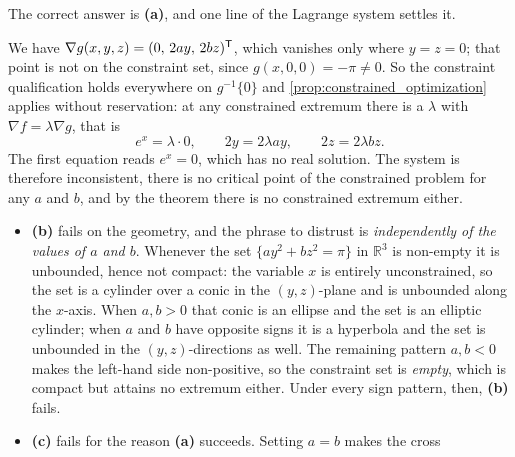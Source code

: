 \begin{exercisesolution}
\label{sol:kobel_lagrange_single_choice}
The correct answer is \textbf{(a)}, and one line of the Lagrange system settles it.

We have $\nabla g(x,y,z) = (0,\,2ay,\,2bz)^{\mathsf{T}}$, which vanishes only where $y = z = 0$; that
point is not on the constraint set, since $g(x,0,0) = -\pi \neq 0$. So the constraint
qualification holds everywhere on $g^{-1}\{0\}$ and \cref{prop:constrained_optimization} applies
without reservation: at any constrained extremum there is a $\lambda$ with
$\nabla f = \lambda\nabla g$, that is
\[e^x = \lambda \cdot 0, \qquad 2y = 2\lambda a y, \qquad 2z = 2\lambda b z.\]
The first equation reads $e^x = 0$, which has no real solution. The system is therefore
inconsistent, there is no critical point of the constrained problem for any $a$ and $b$, and by the
theorem there is no constrained extremum either.
\begin{remark}
\begin{itemize}
  \item \textbf{(b)} fails on the geometry, and the phrase to distrust is \emph{independently of
    the values of $a$ and $b$}. Whenever the set $\{ay^2+bz^2 = \pi\}$ in $\mathbb{R}^3$ is
    non-empty it is unbounded, hence not compact: the variable $x$ is entirely unconstrained, so
    the set is a cylinder over a
    conic in the $(y,z)$-plane and is unbounded along the $x$-axis. When $a,b>0$ that conic is an
    ellipse and the set is an elliptic cylinder; when $a$ and $b$ have opposite signs it is a
    hyperbola and the set is unbounded in the $(y,z)$-directions as well. The remaining pattern
    $a,b<0$ makes the left-hand side non-positive, so the constraint set is \emph{empty}, which is
    compact but attains no extremum either. Under every sign pattern, then, \textbf{(b)} fails.
  \item \textbf{(c)} fails for the reason \textbf{(a)} succeeds. Setting $a=b$ makes the cross

\end{itemize}
\end{remark}
\end{exercisesolution}
